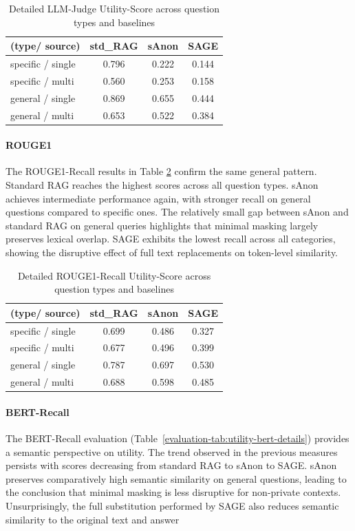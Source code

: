 \begin{table}[h!]
\centering
\caption{Detailed LLM-Judge Utility-Score across question types and baselines}
\label{evaluation-tab:utility-llm-details}
\begin{tabular}{l c c c}
\toprule
\textbf{(type/ source)} & \textbf{std\_RAG} & \textbf{sAnon} & \textbf{SAGE} \\
\midrule
specific / single & 0.796 & 0.222 & 0.144 \\
specific / multi & 0.560 & 0.253 & 0.158 \\
general / single & 0.869 & 0.655 & 0.444 \\
general / multi & 0.653 & 0.522 & 0.384 \\
\bottomrule
\end{tabular}
\end{table}


\paragraph{ROUGE1}
The ROUGE1-Recall results in Table \ref{evaluation-tab:utility-rouge-details} confirm the same general pattern. Standard RAG reaches the highest scores across all question types. sAnon achieves intermediate performance again, with stronger recall on general questions compared to specific ones. The relatively small gap between sAnon and standard RAG on general queries highlights that minimal masking largely preserves lexical overlap. SAGE exhibits the lowest recall across all categories, showing the disruptive effect of full text replacements on token-level similarity.

\begin{table}[h!]
\centering
\caption{Detailed ROUGE1-Recall Utility-Score across question types and baselines}
\label{evaluation-tab:utility-rouge-details}
\begin{tabular}{l c c c}
\toprule
\textbf{(type/ source)} & \textbf{std\_RAG} & \textbf{sAnon} & \textbf{SAGE} \\
\midrule
specific / single & 0.699 & 0.486 & 0.327 \\
specific / multi & 0.677 & 0.496 & 0.399 \\
general / single & 0.787 & 0.697 & 0.530 \\
general / multi & 0.688 & 0.598 & 0.485 \\
\bottomrule
\end{tabular}
\end{table}

\paragraph{BERT-Recall}
The BERT-Recall evaluation (Table~\ref{evaluation-tab:utility-bert-details}) provides a semantic perspective on utility. The trend observed in the previous measures persists with scores decreasing from standard RAG to sAnon to SAGE. sAnon preserves comparatively high semantic similarity on general questions, leading to the conclusion that minimal masking is less disruptive for non-private contexts. Unsurprisingly, the full substitution performed by SAGE also reduces semantic similarity to the original text and answer


